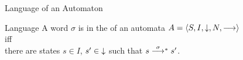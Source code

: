 \documentclass[aspectratio=169]{beamer}
\begin{document}
\begin{slide}{Language of an Automaton}
\small




\begin{block}{Language}
  \centering
  A word $\sigma$ is in the  of an automata $A = \mathopen{\langle}S,I,{\downarrow},N,\longrightarrow\mathclose{\rangle}$
  \\iff\\
  there are states $s\in I$, $s' \in {\downarrow}$ such that $s\rtrant{\sigma}s'$.
\end{block}
\end{slide}
\end{document}
